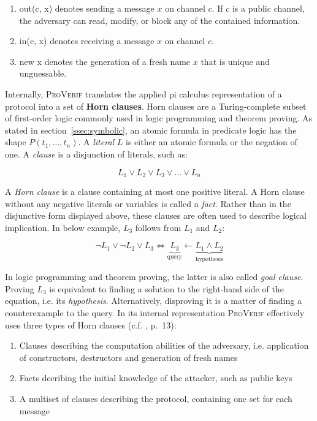 \begin{enumerate}[label=--]
    \item \textsf{out(c, x)} denotes sending a message $x$ on channel $c$. If $c$ is a public channel, the adversary can read, modify, or block any of the contained information.
    \item \textsf{in(c, x)} denotes receiving a message $x$ on channel $c$.
    \item \textsf{new x} denotes the generation of a fresh name $x$ that is unique and unguessable.
\end{enumerate}

Internally, \textsc{ProVerif} translates the applied pi calculus representation of a protocol into a set of \textbf{Horn clauses}.
Horn clauses are a Turing-complete subset of first-order logic commonly used in logic programming and theorem proving.
As stated in section~\ref{ssec:symbolic}, an atomic formula in predicate logic has the shape $P(t_1, \ldots, t_n)$.
A \textit{literal} $L$ is either an atomic formula or the negation of one.
A \textit{clause} is a disjunction of literals, such as:

\begin{equation}
    L_1 \vee L_2 \vee L_3 \vee \ldots \vee L_n
\end{equation}

\noindent
A \textit{Horn clause} is a clause containing at most one positive literal.
A Horn clause without any negative literals or variables is called a \textit{fact}.
Rather than in the disjunctive form displayed above, these clauses are often used to describe logical implication.
In below example, $L_3$ follows from $L_1$ and $L_2$:

\begin{equation}
    \label{eq:implication}
    \lnot L_1 \vee \lnot L_2 \vee L_3 \Leftrightarrow  \underbrace{L_3}_\text{query} \leftarrow \underbrace{L_1 \wedge L_2}_\text{hypothesis}
\end{equation}

In logic programming and theorem proving, the latter is also called \textit{goal clause}.
Proving $L_3$ is equivalent to finding a solution to the right-hand side of the equation, i.e. its \textit{hypothesis}.
Alternatively, disproving it is a matter of finding a counterexample to the query.
In its internal representation \textsc{ProVerif} effectively uses three types of Horn clauses (c.f. \cite{blanchet2013automatic}, p.~13):

\begin{enumerate}[label=--]
    \item Clauses describing the computation abilities of the adversary, i.e. application of constructors, destructors and generation of fresh names
    \item Facts decribing the initial knowledge of the attacker, such as public keys
    \item A multiset of clauses describing the protocol, containing one set for each message
\end{enumerate}

